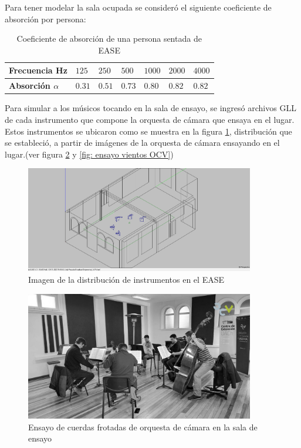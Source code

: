 \noindent Para tener modelar la sala ocupada se consideró el siguiente coeficiente de absorción por persona:
\begin{table}[H]
    \centering
    \caption{Coeficiente de absorción de una persona sentada de EASE}
    \label{tab: coef abs persona}
    \begin{tabular}{|l|l|l|l|l|l|l|}
    \hline
    \textbf{Frecuencia Hz}      & $125$  & $250$  & $500$  & $1000$ & $2000$ & $4000$ \\ \hline
    \textbf{Absorción $\alpha$} & $0.31$ & $0.51$ & $0.73$ & $0.80$ & $0.82$ & $0.82$ \\ \hline
    \end{tabular}
\end{table}

\noindent Para simular a los músicos tocando en la sala de ensayo, se ingresó archivos GLL de
cada instrumento que compone la orquesta de cámara que ensaya en el lugar.\cite{ackermann2023database}
Estos instrumentos se ubicaron como se muestra en la figura \ref{fig: EASE instrumentos}, distribución que se estableció,
a partir de imágenes de la orquesta de cámara ensayando en el lugar.(ver figura \ref{fig: ensayo cuerdas OCV} y \ref{fig: ensayo vientos OCV})
\begin{figure}
    \centering
    \includegraphics[width=10cm]{Imagenes/Modelacion/Instrumentos_ease.png}
    \caption{Imagen de la distribución de instrumentos en el EASE}
    \label{fig: EASE instrumentos}
\end{figure}
\begin{figure}[H]
    \centering
    \includegraphics[width=10cm]{Imagenes/OCV/OCV cuerdas.jpg}
    \caption{Ensayo de cuerdas frotadas de orquesta de cámara en la sala de ensayo}
    \label{fig: ensayo cuerdas OCV}
\end{figure}

